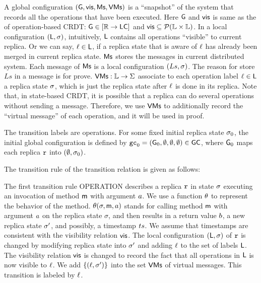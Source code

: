 A global configuration $(\mathsf{G}, \mathsf{vis}, \mathsf{Ms}, \mathsf{VMs})$ is a ``snapshot'' of the system that records all the operations that have been executed. Here $\mathsf{G}$ and $\mathsf{vis}$ is same as the of operation-based CRDT: $\mathsf{G} \in [\mathbb{R} \rightarrow \mathsf{LC}]$ and $\mathsf{vis}\subseteq \mathcal{P}(\mathbb{L} \times \mathbb{L})$. In a local configuration $(\mathsf{L}, \sigma)$, intuitively, $\mathsf{L}$ contains all operations ``visible'' to current replica. Or we can say, $\ell \in \mathsf{L}$, if a replica state that is aware of $\ell$ has already been merged in current replica state. $\mathsf{Ms}$ stores the messages in current distributed system. Each message of $\mathsf{Ms}$ is a local configuration $(Ls,\sigma)$. %
The reason for store $Ls$ in a message is for prove. $\mathsf{VMs}: \mathbb{L} \rightarrow \Sigma$ associate to each operation label $\ell \in \mathsf{L}$ a replica state $\sigma$, which is just the replica state after $\ell$ is done in its replica. Note that, in state-based CRDT, it is possible that a replica can do several operations without sending a message. Therefore, we use $\mathsf{VMs}$ to additionally record the ``virtual message'' of each operation, and it will be used in proof.

The transition labels are operations. For some fixed initial replica state $\sigma_0$, the initial global configuration is defined by $\mathtt{gc}_0 = (\mathsf{G}_0, \emptyset, \emptyset, \emptyset) \in \mathsf{GC}$, where $\mathsf{G}_0$ maps each replica $\mathtt{r}$ into $(\emptyset, \sigma_0)$.

The transition rule of the transition relation is given as follows:

The first transition rule OPERATION describes a replica $\mathtt{r}$ in state $\sigma$ executing an invocation of method $\mathsf{m}$ with argument $a$. We use a function $\theta$ to represent the behavior of the method. %
$\theta(\sigma,\mathsf{m},a)$ stands for calling method $\mathsf{m}$ with argument $a$ on the replica state $\sigma$, and then results in a return value $b$, a new replica state $\sigma'$, and possibly, a timestamp $ts$. We assume that timestamps are consistent with the visibility relation
$\mathsf{vis}$. The local configuration $(\mathsf{L},\sigma)$ of $\mathtt{r}$ is changed by modifying replica state into $\sigma'$ and adding $\ell$ to the set of labels $\mathsf{L}$. The visibility relation $\mathsf{vis}$ is changed to record the fact that all operations in $\mathsf{L}$ is now visible to $\ell$. We add $\{ (\ell,\sigma') \}$ into the set $\mathsf{VMs}$ of virtual messages. This transition is labeled by $\ell$.


